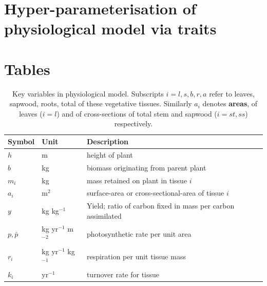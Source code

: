 \documentclass[10pt,twoside]{article}
\begin{document}
\section{Hyper-parameterisation of physiological model via
traits}\label{traits}

\clearpage

\section{Tables}\label{tables}

\begin{table}[ht]
 \caption{Key variables in physiological model. 
 Subscripts $i=l,s,b,r,a$ refer to leaves, sapwood, roots, total of these vegetative tissues. Similarly $a_i$ denotes \textbf{areas}, of leaves ($i=l$) and of cross-sections of total stem and sapwood ($i= st,ss$) respectively.}
\centering
  \begin{tabular}{p{2cm}p{2cm}p{7cm}}
  \hline
  Symbol & Unit & Description \\
  \hline
  $h$   & m  & height of plant\\
  $b$   & kg  & biomass originating from parent plant\\
  $m_i$ & kg  & mass retained on plant in tissue $i$\\
  $a_i$ & m$^2$  & surface-area or cross-sectional-area of tissue $i$\\
  $y$ & kg kg$^{-1}$ & Yield; ratio of carbon fixed in mass per carbon assimilated \\
  $p,\bar{p}$ & kg yr$^{-1}$ m$^{-2}$  & photosynthetic rate per unit area \\
  $r_i$ & kg yr$^{-1}$ kg$^{-1}$  & respiration per unit tissue mass \\
  $k_i$ & yr$^{-1}$ & turnover rate for tissue \\
  \hline
  \end{tabular}
\label{tab:definitions}
\end{table}

\newpage
\end{document}
